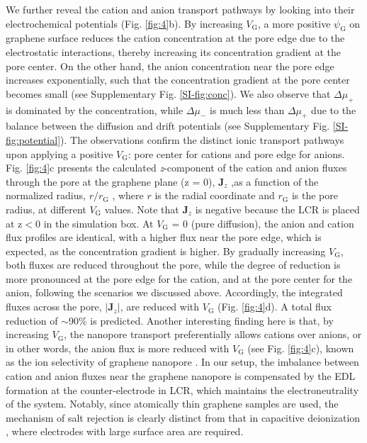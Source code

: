 \documentclass[journal=langd5,email=true, hyperref=true, keywords=false]{achemso}
\newcommand{\Fig}{Fig.}
\begin{document}
We further reveal the cation and anion transport pathways by looking
into their electrochemical potentials (\Fig{} \ref{fig:4}b). By
increasing $V_{\mathrm{G}}$, a more positive $\psi_{\mathrm{G}}$ on
graphene surface reduces the cation concentration at the pore edge due
to the electrostatic interactions, thereby increasing its
concentration gradient at the pore center. On the other hand, the
anion concentration near the pore edge increases exponentially, such
that the concentration gradient at the pore center becomes small (see
Supplementary \Fig{} \ref{SI-fig:conc}). We also observe that
$\Delta \mu_{+}$ is dominated by the concentration, while
$\Delta \mu_{-}$ is much less than $\Delta \mu_{+}$ due to the balance
between the diffusion and drift potentials (see Supplementary \Fig{}
\ref{SI-fig:potential}). The observations confirm the distinct ionic
transport pathways upon applying a positive $V_{\mathrm{G}}$: pore
center for cations and pore edge for anions. \Fig{} \ref{fig:4}c
presents the calculated \textit{z}-component of the cation and anion
fluxes through the pore at the graphene plane (z = 0),
$\boldsymbol{J}_{z}$ ,as a function of the normalized radius,
$r/r_{\mathrm{G}}$ , where $r$ is the radial coordinate and
$r_{\mathrm{G}}$ is the pore radius, at different $V_{\mathrm{G}}$
values. Note that $\boldsymbol{J}_{z}$ is negative because the LCR is
placed at z$<$0 in the simulation box. At $V_{\mathrm{G}}$ = 0 (pure
diffusion), the anion and cation flux profiles are identical, with a
higher flux near the pore edge, which is expected, as the
concentration gradient is higher. By gradually increasing
$V_{\mathrm{G}}$, both fluxes are reduced throughout the pore, while
the degree of reduction is more pronounced at the pore edge for the
cation, and at the pore center for the anion, following the scenarios
we discussed above. Accordingly, the integrated fluxes across the
pore, $|\boldsymbol{J}_{z}|$, are reduced with $V_{\mathrm{G}}$
(\Fig{} \ref{fig:4}d). A total flux reduction of $\sim$90\% is
predicted. Another interesting finding here is that, by increasing
$V_{\mathrm{G}}$, the nanopore transport preferentially allows cations
over anions, or in other words, the anion flux is more reduced with
$V_{\mathrm{G}}$ (see \Fig{} \ref{fig:4}c), known as the ion
selectivity of graphene nanopore \cite{Rollings_2016}. In our setup,
the imbalance between cation and anion fluxes near the graphene
nanopore is compensated by the EDL formation at the counter-electrode
in LCR, which maintains the electroneutrality of the system. Notably,
since atomically thin graphene samples are used, the mechanism of salt
rejection is clearly distinct from that in capacitive deionization
\cite{Biesheuvel_2010}, where electrodes with large surface area are
required.
\end{document}
